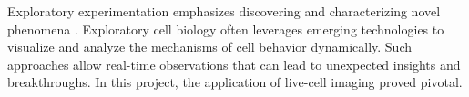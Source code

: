 



% 
%
\label{sec:discussion_potential_breakthroughs}%
Exploratory experimentation emphasizes discovering and characterizing novel
phenomena \cite{mattigClassifyingExploratoryExperimentation2022}. Exploratory
cell biology often leverages emerging technologies to visualize and analyze the
mechanisms of cell behavior dynamically. Such approaches allow real-time
observations that can lead to unexpected insights and breakthroughs. In this
project, the application of live-cell imaging proved pivotal.

